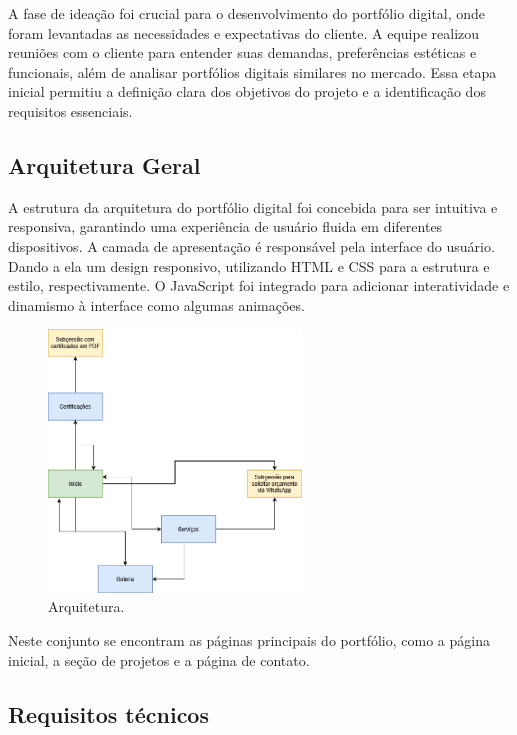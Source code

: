 A fase de ideação foi crucial para o desenvolvimento do portfólio digital, onde foram levantadas as necessidades e expectativas do cliente. A equipe realizou reuniões com o cliente para entender suas demandas, preferências estéticas e funcionais, além de analisar portfólios digitais similares no mercado. Essa etapa inicial permitiu a definição clara dos objetivos do projeto e a identificação dos requisitos essenciais.

\subsection{Arquitetura Geral}
 A estrutura da arquitetura do portfólio digital foi concebida para ser intuitiva e responsiva, garantindo uma experiência de usuário fluida em diferentes dispositivos. A camada de apresentação é responsável pela interface do usuário. Dando a ela um design responsivo, utilizando HTML e CSS para a estrutura e estilo, respectivamente. O JavaScript foi integrado para adicionar interatividade e dinamismo à interface como algumas animações.

\begin{figure}[H]
    \centering
    \includegraphics[width=0.6\textwidth]{Figures/arquitetura.png} %
    \caption{Arquitetura.}
    \label{fig:Arquitetura}
\end{figure}

Neste conjunto se encontram as páginas principais do portfólio, como a página inicial, a seção de projetos e a página de contato.

\subsection{Requisitos técnicos}

